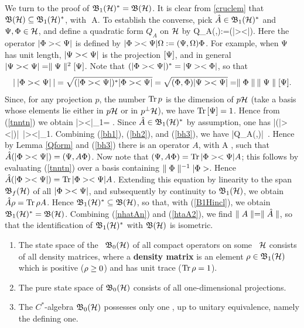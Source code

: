 We turn to the proof of ${\frak B}_1({\cal H})^*={\frak B}({\cal H})$. It is clear from
\ref{cruclem} that ${\frak B}({\cal H})\subseteq{\frak B}_1({\cal H})^*$, with \be
\n{}\n\,\leq\,\n A\n.  \ee To establish the converse,
pick $\hat{A}\in{\frak B}_1({\cal H})^*$ and $\Psi,\Phi\in{\cal H}$, and define a quadratic
form $Q_A$ on ${\cal H}$ by \be Q_A(\Ps,\Ph):=(|\Ph><\Ps|). 
\ee Here the operator $|\Phi><\Psi|$ is defined by $|\Phi><\Psi|\Omega:=
(\Psi,\Omega)\Phi$. For example, when $\Psi$ has unit length, $|\Psi><\Psi|$
is the projection $[\Psi]$, and in general $|\Psi><\Psi|=\parallel\Psi\parallel^2[\Psi]$.
Note that $(|\Phi><\Psi|)^*=|\Psi><\Phi|$, so that
$$
|\:|\Phi><\Psi|\:|=\sqrt{(|\Phi><\Psi|)^*|\Phi><\Psi|}=\sqrt{(\Phi,\Phi)|\Psi><\Psi|}=
\parallel\Phi\parallel\: \parallel\Psi\parallel [\Psi].
$$
Since, for any projection $p$, the number $\mbox{\rm Tr}\, p$ is the dimension of
$p{\cal H}$ (take a basis whose elements lie either in $p{\cal H}$ or in
$p^{\perp}{\cal H}$), we have $\mbox{\rm Tr}\, [\Psi]=1$. Hence from (\ref{tnntn}) we
obtain \be \n |\Ph><\Ps|\n_1=\n\Ph\n\: \n\Ps\n .   \ee Since
$\hat{A}\in{\frak B}_1({\cal H})^*$ by assumption, one has \be
|(|\Ph><\Ps|)|\,\leq \n{}\n\: \n |\Ph><\Ps|\n_1. 
\ee Combining (\ref{bh1}), (\ref{bh2}), and (\ref{bh3}), we have \be
|Q_A(\Ps,\Ph)|\,\leq \n{}\n \:\n\Ph\n\: \n\Ps\n .  \ee Hence by
Lemma \ref{Qform} and (\ref{bh3}) there is an operator $A$, with \be
\n A\n\,\leq\,\n{}\n,  \ee such that
$\hat{A}(|\Phi><\Psi|)=(\Psi,A\Phi)$.  Now note that $(\Psi,A\Phi)=\mbox{\rm Tr}\,
|\Phi><\Psi| A$; this follows by evaluating (\ref{tnntn}) over a basis
containing $\parallel\Phi\parallel^{-1}|\Phi>$. Hence $\hat{A}(|\Phi><\Psi|)=\mbox{\rm Tr}\,
|\Phi><\Psi| A$.  Extending this equation by linearity to the span
${\frak B}_f({\cal H})$ of all $|\Phi><\Psi|$, and subsequently by continuity to
${\frak B}_1({\cal H})$, we obtain $\hat{A}\rho=\mbox{\rm Tr}\,\rho A$. Hence
${\frak B}_1({\cal H})^*\subseteq{\frak B}({\cal H})$, so that, with (\ref{B1Hincl}), we obtain
${\frak B}_1({\cal H})^*={\frak B}({\cal H})$.  Combining (\ref{nhatAn}) and (\ref{htaA2}), we find
$\parallel A\parallel=\parallel\hat{A}\parallel$, so that the identification of ${\frak B}_1({\cal H})^*$ with
${\frak B}({\cal H})$ is isometric.  \enp
\begin{Corollary}
\begin{enumerate}
\item
The state space of the \ca\ ${\frak B}_0({\cal H})$ of all compact operators on some
\Hs\ ${\cal H}$ consists of all density matrices, where a {\bf density
matrix} is an element $\rho\in{\frak B}_1({\cal H})$ which is positive ($\rho\geq 0$)
and has unit trace ($\mbox{\rm Tr}\,\rho=1$).
\item
The pure state space of ${\frak B}_0({\cal H})$ consists of all one-dimensional
projections.
\item
The $C^*$-algebra ${\frak B}_0({\cal H})$ possesses only one \irrep, up to unitary
equivalence, namely the defining one.
\end{enumerate}
\end{Corollary}

